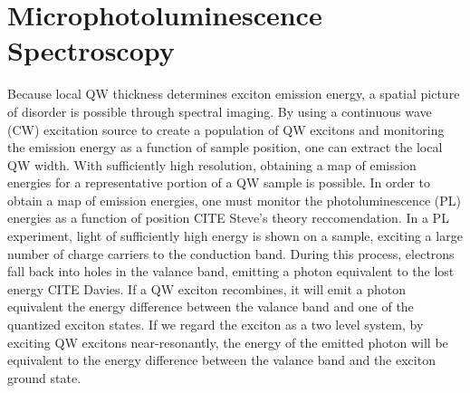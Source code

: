 \section{Microphotoluminescence Spectroscopy}
\indent Because local QW thickness determines exciton emission energy, a spatial picture of disorder is possible through spectral imaging. By using a continuous wave (CW) excitation source to create a population of QW excitons and monitoring the emission energy as a function of sample position, one can extract the local QW width. With sufficiently high resolution, obtaining a map of emission energies for a representative portion of a QW sample is possible. In order to obtain a map of emission energies, one must monitor the photoluminescence (PL) energies as a function of position CITE Steve's theory reccomendation. In a PL experiment, light of sufficiently high energy is shown on a sample, exciting a large number of charge carriers to the conduction band. During this process, electrons fall back into holes in the valance band, emitting a photon equivalent to the lost energy CITE Davies. If a QW exciton recombines, it will emit a photon equivalent the energy difference between the valance band and one of the quantized exciton states. If we regard the exciton as a two level system, by exciting QW excitons near-resonantly, the energy of the emitted photon will be equivalent to the energy difference between the valance band and the exciton ground state. 

